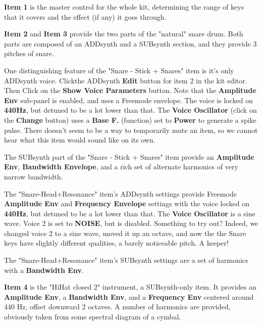    \textbf{Item 1} is the master control for the whole kit, determining the
   range of keys that it covers and the effect (if any) it goes through.

   \textbf{Item 2} and \textbf{Item 3} provide the two parts of the
   "natural" snare drum.  Both parts are composed of an ADDsynth and a
   SUBsynth section, and they provide 3 pitches of snare.

   One distinguishing feature of the "Snare - Stick + Snares" item
   is it's only ADDsynth voice.  Clickthe ADDsynth \textbf{Edit} button for
   item 2 in the kit editor.  Then Click on the
   \textbf{Show Voice Parameters} button.
   Note that the \textbf{Amplitude Env} sub-panel is enabled, and uses a
   Freemode envelope.  The voice is locked on \textbf{440Hz}, but detuned to
   be a lot lower than that.  The \textbf{Voice Oscillator}
   (click on the \textbf{Change} button) uses a
   \textbf{Base F.} (function)
   set to \textbf{Power}
   to generate a spike pulse.
   There doesn't seem to be a way to temporarily mute an item, so we cannot
   hear what this item would sound like on its own.

   The SUBsynth part of the "Snare - Stick + Snares" item provide an
   \textbf{Amplitude Env}, \textbf{Bandwidth Envelope}, and a rich set of
   alternate harmonics of very narrow bandwidth.

   The "Snare-Head+Resonance" item's ADDsynth settings 
   provide Freemode \textbf{Amplitude Env} and \textbf{Frequency Envelope}
   settings with the voice locked on \textbf{440Hz}, but detuned to
   be a lot lower than that.  The \textbf{Voice Oscillator} is a sine wave.
   Voice 2 is set to \textbf{NOISE}, but is disabled.  Something to try out?
   Indeed, we changed voice 2 to a sine wave, moved it up an octave,
   and now the the Snare keys have slightly different qualities, a barely
   noticeable pitch.  A keeper!

   The "Snare-Head+Resonance" item's SUBsynth settings are a set of
   harmonics with a \textbf{Bandwidth Env}.

   \textbf{Item 4} is the "HiHat closed 2" instrument, a SUBsynth-only item.
   It provides an \textbf{Amplitude Env}, a \textbf{Bandwidth Env},
   and a \textbf{Frequency Env} centered around 440 Hz, offset downward 2
   octaves.  A number of harmonics are provided, obviously taken from some
   spectral diagram of a cymbal.

